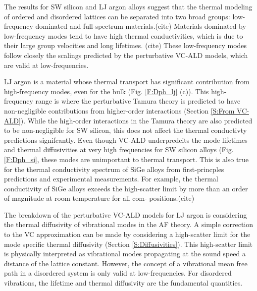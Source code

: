 \documentclass[aps,prb,onecolumn,preprint,superscriptaddress,amsmath,amssymb,floatfix]{revtex4}
\newcommand{\kv}{\mspace{-4.0mu}\left(\mspace{-8.0mu}
\begin{smallmatrix}&\pmb{\kappa} \\&\nu\end{smallmatrix}
\mspace{-3.0mu}\right)}
\begin{document}
The results for SW silicon and LJ argon alloys suggest that 
the thermal modeling of ordered and 
disordered lattices can be separated into two broad groups: 
low-frequency dominated and full-spectrum materials.(cite) 
Materials dominated 
by low-frequency modes tend to have high thermal conductivities, 
which is due to their large group velocities and long lifetimes.
(cite) These low-frequency modes  
follow closely the scalings predicted by the perturbative VC-ALD 
models, which are valid at low-frequencies. 

LJ argon is a material whose thermal transport has significant 
contribution from high-frequency modes, even for the bulk 
(Fig. \ref{F:Dph_lj} (c)). 
This high-frequency range is where the perturbative Tamura theory 
is predicted to have non-negligible contributions from higher-order 
interactions (Section \ref{S:From VC-ALD}). 
While the 
high-order interactions in the Tamura theory are also predicted to be 
non-negligible for SW silicon, this does not affect the thermal 
conductivty predictions signifcantly. Even though VC-ALD underpredcits 
the mode lifetimes and thermal diffusivities at very high frequencies 
for SW silicon alloys (Fig. \ref{F:Dph_si},  
these modes 
are unimportant to thermal transport. This is also 
true for the thermal conductivity spectrum of SiGe alloys 
from first-princples predictions\cite{garg_role_2011} and experimental 
measurements.\cite{abeles_thermal_1962,cahill_thermal_2004,
cahill_thermal_2005,cheaito_experimental_2012} 
For example, the thermal conductivity of SiGe alloys
exceeds the high-scatter limit by more than
an order of magnitude at room temperature for all com-
positions.(cite)

The breakdown of the perturbative VC-ALD models for LJ argon 
is  considering the thermal diffusivity of vibrational 
modes in the AF theory. 
A simple correction to the VC approximation can be made by considering 
a high-scatter limit for the mode specific thermal 
diffusivity (Section \ref{S:Diffusivities}). 
This high-scatter limit is physically interpreted as vibrational modes 
propagating at the sound speed a distance of the lattice constant. 
However, the concept of a vibrational mean free path 
in a disordered system is only valid at low-frequencies.
\cite{feldman_numerical_1999,xu_energy_2009} For 
disordered vibrations, the lifetime and thermal diffusivity are the 
fundamental quantities. 

\end{document}
